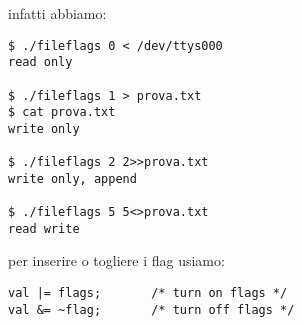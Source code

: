 infatti abbiamo:

\begin{lstlisting}
$ ./fileflags 0 < /dev/ttys000
read only

$ ./fileflags 1 > prova.txt
$ cat prova.txt 
write only

$ ./fileflags 2 2>>prova.txt 
write only, append

$ ./fileflags 5 5<>prova.txt 
read write
\end{lstlisting}

per inserire o togliere i flag usiamo:

\begin{lstlisting}
val |= flags;		/* turn on flags */
val &= ~flag;		/* turn off flags */
\end{lstlisting}

